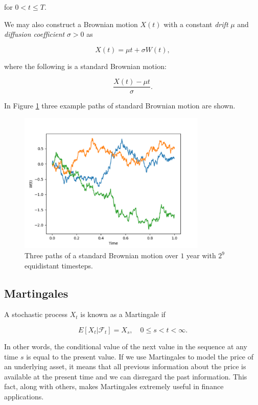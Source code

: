 for $0 < t \le T$.

We may also construct a Brownian motion $X(t)$ with a constant \textit{drift} $\mu$ and \textit{diffusion coefficient} $\sigma > 0$ as

\begin{equation*}
    X(t) = \mu t + \sigma W(t),
\end{equation*}

where the following is a standard Brownian motion: 

\begin{equation*}
    \frac{X(t) - \mu t}{\sigma}.
\end{equation*}

In Figure \ref{fig:standardbrownianmotion} three example paths of standard Brownian motion are shown.

\begin{figure}[h]
    \centering
    \includegraphics[width=0.8\textwidth]{figures/standard brownian motion.pdf}
    \caption{Three paths of a standard Brownian motion over $1$ year with $2^9$ equidistant timesteps.}
    \label{fig:standardbrownianmotion}
\end{figure}

\subsection{Martingales}
A stochastic process $X_t$ is known as a Martingale if 

\begin{equation*}
    E[X_t|\mathcal{F}_t] = X_s, \quad 0 \le s < t < \infty.
\end{equation*}

In other words, the conditional value of the next value in the sequence at any time $s$ is equal to the present value. If we use Martingales to model the price of an underlying asset, it means that all previous information about the price is available at the present time and we can disregard the past information. This fact, along with others, makes Martingales extremely useful in finance applications.

